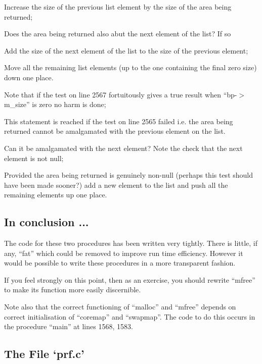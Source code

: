 \item [2566:] Increase the size of the previous
list element by the size of the
area being returned;

\item[2567:] Does the area being returned also
 abut the next element of the
 list? If so

\item[2568:] Add the size of the next element
 of the list to the size of the
 previous element;

\item[2569:] Move all the remaining list elements (up to the one containing
 the final zero size) down one
 place.
 
 Note that if the test on line
 2567 fortuitously gives a true
 result when ``bp-$>$m\_size'' is zero
 no harm is done;

\item[2576:] This statement is reached if the
 test on line 2565 failed i.e. the
 area being returned cannot be
 amalgamated with the previous
 element on the list.

 Can it be amalgamated with the
 next element? Note the check that
 the next element is not null;

\item[2579:] Provided the area being returned
 is genuinely non-null (perhaps
 this test should have been made
 sooner?) add a new element to the
 list and push all the remaining
 elements up one place.
\ed


\subsection{In conclusion ...}

The code for these two procedures has
been written very tightly. There is
little, if any, ``fat'' which could be
removed to improve run time efficiency.
However it would be possible to write
these procedures in a more transparent
fashion.


If you feel strongly on this point,
then as an exercise, you should rewrite
``mfree'' to make its function more
easily discernible.

Note also that the correct functioning
of ``malloc'' and ``mfree'' depends on
correct initialisation of ``coremap'' and
``swapmap''. The code to do this occurs
in the procedure ``main'' at lines 1568,
1583.


\subsection{The File `prf.c'}

